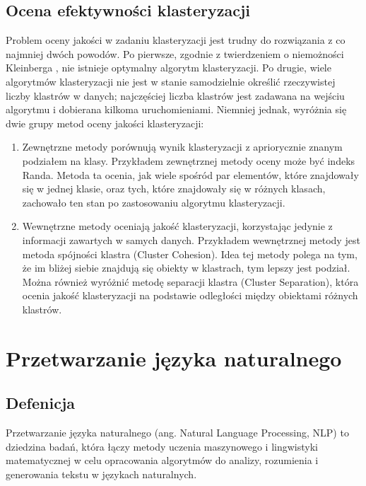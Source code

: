	\subsection{Ocena efektywności klasteryzacji}
		Problem oceny jakości w zadaniu klasteryzacji jest trudny do rozwiązania z co najmniej dwóch powodów. Po pierwsze, zgodnie z twierdzeniem o niemożności Kleinberga \cite{Kleinberg}, nie istnieje optymalny algorytm klasteryzacji. Po drugie, wiele algorytmów klasteryzacji nie jest w stanie samodzielnie określić rzeczywistej liczby klastrów w danych; najczęściej liczba klastrów jest zadawana na wejściu algorytmu i dobierana kilkoma uruchomieniami.
		Niemniej jednak, wyróżnia się dwie grupy metod oceny jakości klasteryzacji:
		\begin{enumerate}
			\item Zewnętrzne metody porównują wynik klasteryzacji z apriorycznie znanym podziałem na klasy. Przykładem zewnętrznej metody oceny może być indeks Randa. Metoda ta ocenia, jak wiele spośród par elementów, które znajdowały się w jednej klasie, oraz tych, które znajdowały się w różnych klasach, zachowało ten stan po zastosowaniu algorytmu klasteryzacji.
			\item Wewnętrzne metody oceniają jakość klasteryzacji, korzystając jedynie z informacji zawartych w samych danych. Przykładem wewnętrznej metody jest metoda spójności klastra (Cluster Cohesion). Idea tej metody polega na tym, że im bliżej siebie znajdują się obiekty w klastrach, tym lepszy jest podział. Można również wyróżnić metodę separacji klastra (Cluster Separation), która ocenia jakość klasteryzacji na podstawie odległości między obiektami różnych klastrów.
		\end{enumerate}


\section{Przetwarzanie języka naturalnego}

	\subsection{Defenicja}
		Przetwarzanie języka naturalnego (ang. Natural Language Processing, NLP) to dziedzina badań, która łączy metody uczenia maszynowego i lingwistyki matematycznej w celu opracowania algorytmów do analizy, rozumienia i generowania tekstu w językach naturalnych. \cite{NLP}


